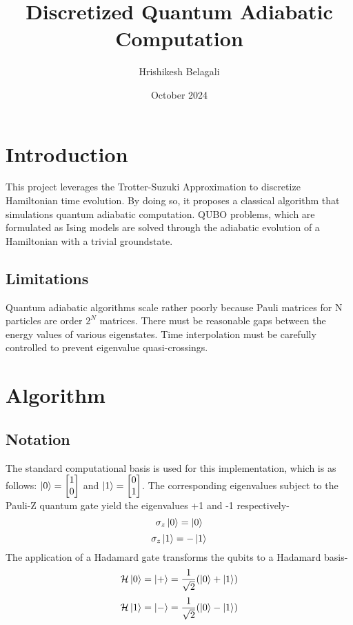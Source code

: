 \documentclass{article}
\title{Discretized Quantum Adiabatic Computation}
\author{Hrishikesh Belagali}
\date{October 2024}
\begin{document}
 
\maketitle
\section{Introduction}
This project leverages the Trotter-Suzuki Approximation to discretize Hamiltonian time evolution. By doing so, it proposes a classical algorithm that simulations quantum adiabatic computation. 
QUBO problems, which are formulated as Ising models are solved through the adiabatic evolution of a Hamiltonian with a trivial groundstate. 
\subsection{Limitations}
Quantum adiabatic algorithms scale rather poorly because Pauli matrices for N particles are order $2^N$ matrices. There must be reasonable gaps between the energy values of various eigenstates. 
Time interpolation must be carefully controlled to prevent eigenvalue quasi-crossings. 

\section{Algorithm}
\subsection{Notation}
The standard computational basis is used for this implementation, which is as follows: 
$\ket 0 = \begin{bmatrix}
    1 \\ 0
\end{bmatrix}$ and $\ket 1 = \begin{bmatrix}
    0 \\ 1
\end{bmatrix}$. 
The corresponding eigenvalues subject to the Pauli-Z quantum gate yield the eigenvalues +1 and -1 respectively- 
$$\sigma_z \ket 0 = \ket 0$$ 
$$\sigma_z \ket 1 = -\ket 1$$ 
The application of a Hadamard gate transforms the qubits to a Hadamard basis- 
$$\mathcal H \ket 0 = \ket + = \frac{1}{\sqrt 2} \pqty{\ket 0 + \ket 1}$$
$$\mathcal H \ket 1 = \ket - = \frac{1}{\sqrt 2} \pqty{\ket 0 - \ket 1}$$
\end{document}
